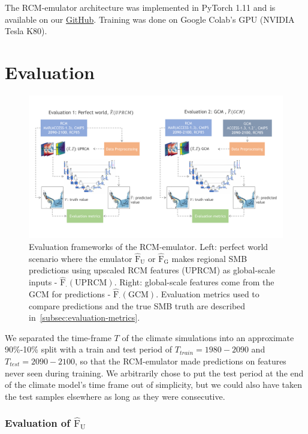 \documentclass[a4paper,11pt,oneside]{report}
\begin{document}
The RCM-emulator architecture was implemented in PyTorch 1.11 and is available on our \href{https://github.com/marvande/master-thesis}{GitHub}. Training was done on Google Colab's GPU (NVIDIA Tesla K80).

\section{Evaluation}\label{sec:evaluation}

\begin{figure}[!t]
  \centering
  \includegraphics[width=\columnwidth]{doc/Thesis-latex/images/evaluation_framework.pdf}
  \caption []{\small Evaluation frameworks of the RCM-emulator. Left: perfect world scenario where the emulator $\mathrm{\hat{F}_{U}}$ or $\mathrm{\hat{F}_{G}}$ makes regional SMB predictions using upscaled RCM features (UPRCM) as global-scale inputs - $\mathrm{\hat{F}_{\cdot}(UPRCM)}$. Right: global-scale features come from the GCM for predictions - $\mathrm{\hat{F}_{\cdot}(GCM)}$. Evaluation metrics used to compare predictions and the true SMB truth are described in~\autoref{subsec:evaluation-metrics}.}
  \vspace{-3mm}
  \label{fig:evaluation-framework}
\end{figure}

We separated the time-frame $T$ of the climate simulations into an approximate 90\%-10\% split with a train and test period of $T_{train} = 1980-2090$ and $T_{test} = 2090-2100$, so that the RCM-emulator made predictions on features never seen during training. We arbitrarily chose to put the test period at the end of the climate model's time frame out of simplicity, but we could also have taken the test samples elsewhere as long as they were consecutive. 
\subsubsection{Evaluation of $\mathrm{\hat{F}_U}$}
\end{document}
